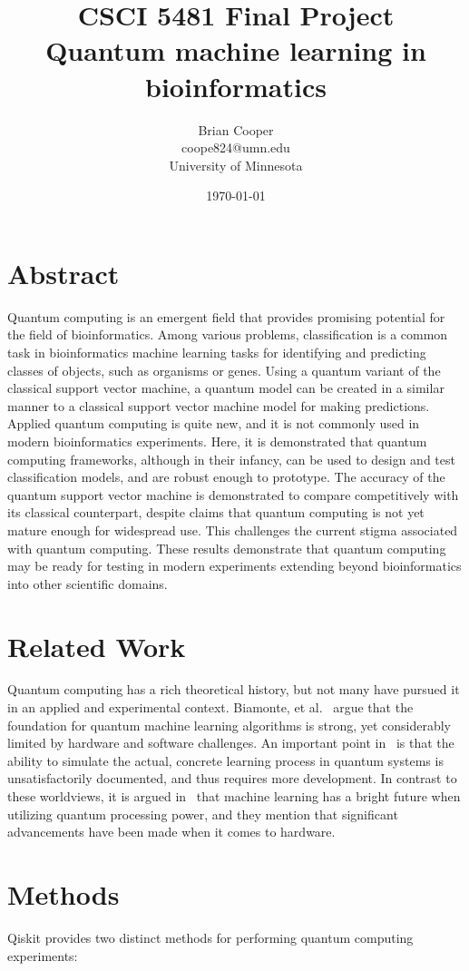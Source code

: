\documentclass{article}
\title{%
  CSCI 5481 Final Project \\
  \large Quantum machine learning in bioinformatics
}
\author{Brian Cooper \\ coope824@umn.edu \\ University of Minnesota}
\date{\today}
\begin{document}
\maketitle

\section{Abstract}
  Quantum computing is an emergent field that provides promising potential for the field of bioinformatics. Among various problems, classification is a common task in bioinformatics machine learning tasks for identifying and predicting classes of objects, such as organisms or genes. Using a quantum variant of the classical support vector machine, a quantum model can be created in a similar manner to a classical support vector machine model for making predictions. Applied quantum computing is quite new, and it is not commonly used in modern bioinformatics experiments. Here, it is demonstrated that quantum computing frameworks, although in their infancy, can be used to design and test classification models, and are robust enough to prototype. The accuracy of the quantum support vector machine is demonstrated to compare competitively with its classical counterpart, despite claims that quantum computing is not yet mature enough for widespread use. This challenges the current stigma associated with quantum computing. These results demonstrate that quantum computing may be ready for testing in modern experiments extending beyond bioinformatics into other scientific domains.

\section{Related Work}
  Quantum computing has a rich theoretical history, but not many have pursued it in an applied and experimental context. Biamonte, et al.~\cite{biamonte} argue that the foundation for quantum machine learning algorithms is strong, yet considerably limited by hardware and software challenges. An important point in~\cite{schuld} is that the ability to simulate the actual, concrete learning process in quantum systems is unsatisfactorily documented, and thus requires more development. In contrast to these worldviews, it is argued in~\cite{biamonte} that machine learning has a bright future when utilizing quantum processing power, and they mention that significant advancements have been made when it comes to hardware.

\section{Methods}
  Qiskit provides two distinct methods for performing quantum computing experiments:
\end{document}
